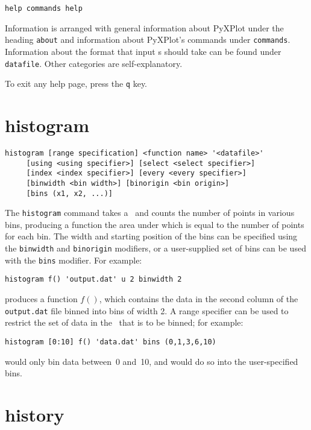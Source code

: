 \begin{verbatim}
help commands help
\end{verbatim}

Information is arranged with general information about PyXPlot under the heading
{\tt about} and information about PyXPlot's commands under {\tt commands}.
Information about the format that input \datafile s should take can be found
under {\tt datafile}.  Other categories are self-explanatory.

To exit any help page, press the {\tt q} key.

\section{histogram}

\begin{verbatim}
histogram [range specification] <function name> '<datafile>' 
     [using <using specifier>] [select <select specifier>]
     [index <index specifier>] [every <every specifier>]
     [binwidth <bin width>] [binorigin <bin origin>]
     [bins (x1, x2, ...)]
\end{verbatim}

The {\tt histogram} command takes a \datafile\ and counts the number of points
in various bins, producing a function the area under which is equal to the
number of points for each bin.  The width and starting position of the bins can
be specified using the {\tt binwidth} and {\tt binorigin} modifiers, or a
user-supplied set of bins can be used with the {\tt bins} modifier.  For
example:

\begin{verbatim}
histogram f() 'output.dat' u 2 binwidth 2
\end{verbatim}

\noindent produces a function $f()$, which contains the data in the second
column of the {\tt output.dat} file binned into bins of width 2.  A range
specifier can be used to restrict the set of data in the \datafile\ that is to be
binned; for example:

\begin{verbatim}
histogram [0:10] f() 'data.dat' bins (0,1,3,6,10)
\end{verbatim}

\noindent would only bin data between~0 and~10, and would do so into the
user-specified bins.

\section{history}

